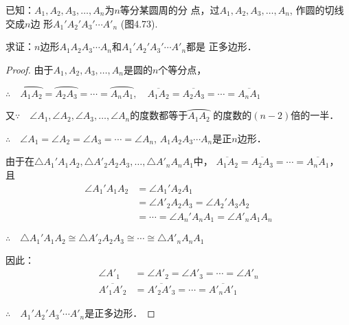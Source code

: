 已知：$A_1,A_2,A_3,\ldots,A_n$为$n$等分某圆周的分
点，过$A_1,A_2,A_3,\ldots,A_n$, 作圆的切线交成$n$边
形$A_1'A_2'A_3'\cdots A'_n$ (图4.73).

求证：$n$边形$A_1A_2A_3\cdots A_n$和$A_1'A_2'A_3'\cdots A'_n$都是
正多边形．

\begin{figure}[htp]
  \centering
{}
  \caption{}
\end{figure}

\begin{proof}
  由于$A_1,A_2,A_3,\ldots,A_n$是圆的$n$个等分点，

  $\therefore\quad  \wideparen{A_1A_2}=\wideparen{A_2A_3}=\cdots=\wideparen{A_nA_1},\quad 
  \overline{A_1A_2}=\overline{A_2A_3}=\cdots=\overline{A_nA_1}$

又$\because\quad \angle A_1,\angle A_2,\angle A_3,\ldots,\angle A_n$的度数都等于$\wideparen{A_1A_2}$
的度数的$(n-2)$倍的一半．

$\therefore\quad \angle A_1=\angle A_2=\angle A_3=\cdots=\angle A_n$, $A_1A_2A_3\cdots A_n$是正$n$边形．

由于在$\triangle A_1'A_1A_2,\triangle A'_2A_2A_3,\ldots,\triangle A'_nA_nA_1$中，
$\overline{A_1A_2}=\overline{A_2A_3}=\cdots=\overline{A_nA_1}$，
且
\begin{equation}
\begin{split}
  \angle A_1'A_1A_2&=\angle A_1'A_2A_1\\
  &=\angle A'_2A_2A_3=\angle A_2'A_3A_2\\
  &=\cdots=\angle A_n'A_nA_1=\angle A'_nA_1A_n 
\end{split}\tag{弦切角定理及其推论}
\end{equation}

$\therefore\quad \triangle A_1'A_1A_2\cong\triangle A'_2A_2A_3\cong\cdots\cong\triangle A'_nA_nA_1$

因此：
\[\begin{split}
  \angle A'_1&=\angle A'_2=\angle A'_3=\cdots=\angle A'_n\\
  \overline{A'_1A'_2}&=\overline{A'_2A'_3}=\cdots=\overline{A'_nA'_1}
\end{split}\]

$\therefore\quad A_1'A_2'A_3'\cdots A'_n$是正多边形．
\end{proof}


